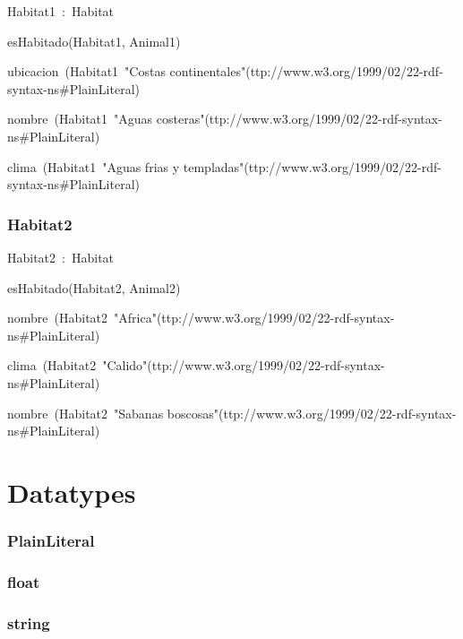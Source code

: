 Habitat1~:~Habitat

esHabitado(Habitat1, Animal1)

ubicacion~(Habitat1~"Costas continentales"^^http://www.w3.org/1999/02/22-rdf-syntax-ns\#PlainLiteral)

nombre~(Habitat1~"Aguas costeras"^^http://www.w3.org/1999/02/22-rdf-syntax-ns\#PlainLiteral)

clima~(Habitat1~"Aguas frias y templadas"^^http://www.w3.org/1999/02/22-rdf-syntax-ns\#PlainLiteral)

\subsubsection*{Habitat2}

Habitat2~:~Habitat

esHabitado(Habitat2, Animal2)

nombre~(Habitat2~"Africa"^^http://www.w3.org/1999/02/22-rdf-syntax-ns\#PlainLiteral)

clima~(Habitat2~"Calido"^^http://www.w3.org/1999/02/22-rdf-syntax-ns\#PlainLiteral)

nombre~(Habitat2~"Sabanas boscosas"^^http://www.w3.org/1999/02/22-rdf-syntax-ns\#PlainLiteral)

\section*{Datatypes}\subsubsection*{PlainLiteral}

\subsubsection*{float}

\subsubsection*{string}

